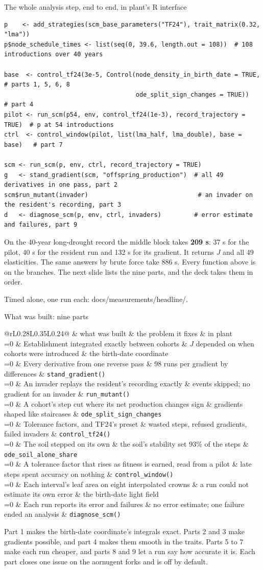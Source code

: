 \documentclass[aspectratio=169,10pt]{beamer}
\makeatletter
\newcommand{\src}[1]{\par\vfill{\tiny\color{quiet} #1}}
\newcommand{\rmrow}[4]{%
  \ifnum#1=\rmcurrent \rowcolor{wash}\fi
  #1 & #2 & #3 & #4 \\}
\newcommand{\roadmap}[1]{%
  \def\rmcurrent{#1}%
  \footnotesize
  \begin{tabular}{@{}rL{0.28\textwidth}L{0.35\textwidth}L{0.24\textwidth}@{}}
    \toprule
    & what was built & the problem it fixes & in plant \\
    \midrule
    \rmrow{1}{Establishment integrated exactly between cohorts}{$J$ depended on when cohorts were introduced}{the birth-date coordinate}
    \rmrow{2}{Every derivative from one reverse pass}{98 runs per gradient by differences}{\texttt{stand\_gradient()}}
    \rmrow{3}{An invader replays the resident's recording exactly}{events skipped; no gradient for an invader}{\texttt{run\_mutant()}}
    \rmrow{4}{A cohort's step cut where its net production changes sign}{gradients shaped like staircases}{\texttt{ode\_split\_sign\_changes}}
    \rmrow{5}{Tolerance factors, and TF24's preset}{wasted steps, refused gradients, failed invaders}{\texttt{control\_tf24()}}
    \rmrow{6}{The soil stepped on its own}{the soil's stability set 93\% of the steps}{\texttt{ode\_soil\_alone\_share}}
    \rmrow{7}{A tolerance factor that rises as fitness is earned, read from a pilot}{late steps spent accuracy on nothing}{\texttt{control\_window()}}
    \rmrow{8}{Each interval's leaf area on eight interpolated crowns}{a run could not estimate its own error}{the birth-date light field}
    \rmrow{9}{Each run reports its error and failures}{no error estimate; one failure ended an analysis}{\texttt{diagnose\_scm()}}
    \bottomrule
  \end{tabular}}
\makeatother
\begin{document}
\begin{frame}[fragile]{The whole analysis step, end to end, in plant's R interface}
  \begin{lstlisting}
p    <- add_strategies(scm_base_parameters("TF24"), trait_matrix(0.32, "lma"))
p$node_schedule_times <- list(seq(0, 39.6, length.out = 108))  # 108 introductions over 40 years

base  <- control_tf24(3e-5, Control(node_density_in_birth_date = TRUE,     # parts 1, 5, 6, 8
                                    ode_split_sign_changes = TRUE))         # part 4
pilot <- run_scm(p54, env, control_tf24(1e-3), record_trajectory = TRUE)  # p at 54 introductions
ctrl  <- control_window(pilot, list(lma_half, lma_double), base = base)   # part 7

scm <- run_scm(p, env, ctrl, record_trajectory = TRUE)
g   <- stand_gradient(scm, "offspring_production")  # all 49 derivatives in one pass, part 2
scm$run_mutant(invader)                              # an invader on the resident's recording, part 3
d   <- diagnose_scm(p, env, ctrl, invaders)         # error estimate and failures, part 9
  \end{lstlisting}
  \small
  On the 40-year long-drought record the middle block takes \textbf{209 s}: 37 s for the pilot,
  40 s for the resident run and 132 s for its gradient. It returns $J$ and all 49 elasticities.
  The same answers by brute force take 886 s. Every function above is on the branches. The
  next slide lists the nine parts, and the deck takes them in order.
  \src{Timed alone, one run each: docs/measurements/headline/.}
\end{frame}

\begin{frame}{What was built: nine parts}
  \roadmap{0}
  \medskip

  \small
  Part 1 makes the birth-date coordinate's integrals exact. Parts 2 and 3 make gradients
  possible, and part 4 makes them smooth in the traits. Parts 5 to 7 make each run cheaper,
  and parts 8 and 9 let a run say how accurate it is. Each part closes
  one issue on the aornugent forks and is off by default.
\end{frame}
\end{document}
